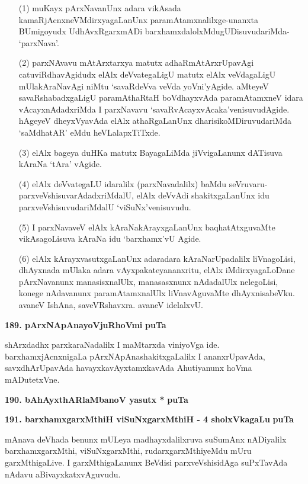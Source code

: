 \begin{itemize}
\item[(1)] muKayx pArxNavanUnx adara vikAsada kamaRjAcnxneVMdirxyagaLanUnx paramAtamxnalilxge-unanxta BUmigoyudx UdhAvxRgarxmADi barxhamxdalolxMdugUDisuvudariMda- `parxNava'.
\item[(2)] parxNAvavu mAtArxtarxya matutx adhaRmAtArxrUpavAgi catuviRdhavAgidudx elAlx deVvategaLigU matutx elAlx veVdagaLigU mUlakAraNavAgi niMtu `savaRdeVva veVda yoVni'yAgide. aMteyeV savaRshabadxgaLigU paramAthaRtaH boVdhayxvAda paramAtamxneV idara vAcayxnAdadxriMda I parxNavavu `savaRvAcayxvAcaka'venisuvudAgide. hAgeyeV dheyxVyavAda elAlx athaRgaLanUnx dharisikoMDiruvudariMda `saMdhatAR' eMdu heVLalapxTiTxde.
\item[(3)] elAlx bageya duHKa matutx BayagaLiMda jiVvigaLanunx dATisuva kAraNa `tAra' vAgide.
\item[(4)] elAlx deVvategaLU idaralilx (parxNavadalilx) baMdu seVruvaru-parxveVshisuvarAdadxriMdalU, elAlx deVvAdi shakitxgaLanUnx idu parxveVshisuvudariMdalU `viSuNx'venisuvudu.
\item[(5)] I parxNavaveV elAlx kAraNakArayxgaLanUnx baqhatAtxguvaMte vikAsagoLisuva kAraNa idu `barxhamx'vU Agide.
\item[(6)] elAlx kArayxvasutxgaLanUnx adaradara kAraNarUpadalilx liVnagoLisi, dhAyxnada mUlaka adara vAyxpakateyananxritu, elAlx iMdirxyagaLoDane pArxNavanunx manasisxnalUlx, manasasxnunx nAdadalUlx nelegoLisi, konege nAdavanunx paramAtamxnalUlx liVnavAguvaMte dhAyxnisabeVku. avaneV IshAna, saveVRshavxra. avaneV idelalxvU.
\end{itemize}

\medskip
\noindent
\textbf{189. pArxNApAnayoVjuRhoVmi} \hfill{\bf puTa }

\smallskip
shArxdadhx parxkaraNadalilx I maMtarxda viniyoVga ide. barxhamxjAcnxnigaLa pArxNApAnashakitxgaLalilx I ananxrUpavAda, savxdhArUpavAda havayxkavAyxtamxkavAda Ahutiyanunx hoVma mADutetxVne.

\medskip
\noindent
\textbf{190. bAhAyxthARlaMbanoV yasutx *} \hfill{\bf puTa }

\medskip
\noindent
\textbf{191. barxhamxgarxMthiH viSuNxgarxMthiH - 4 sholxVkagaLu} \hfill{\bf puTa }

\smallskip
mAnava deVhada benunx mULeya madhayxdalilxruva suSumAnx nADiyalilx barxhamxgarxMthi, viSuNxgarxMthi, rudarxgarxMthiyeMdu mUru garxMthigaLive. I garxMthigaLanunx BeVdisi parxveVshisidAga suPxTavAda nAdavu aBivayxkatxvAguvudu.


